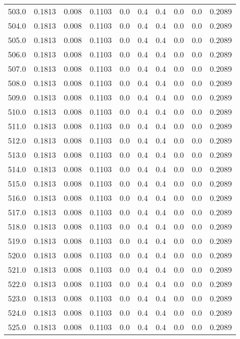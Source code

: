 \begin{longtable}{lrrrrrrrrr}
503.0 & 0.1813 & 0.008 & 0.1103 & 0.0 & 0.4 & 0.4 & 0.0 & 0.0 & 0.2089 \\
504.0 & 0.1813 & 0.008 & 0.1103 & 0.0 & 0.4 & 0.4 & 0.0 & 0.0 & 0.2089 \\
505.0 & 0.1813 & 0.008 & 0.1103 & 0.0 & 0.4 & 0.4 & 0.0 & 0.0 & 0.2089 \\
506.0 & 0.1813 & 0.008 & 0.1103 & 0.0 & 0.4 & 0.4 & 0.0 & 0.0 & 0.2089 \\
507.0 & 0.1813 & 0.008 & 0.1103 & 0.0 & 0.4 & 0.4 & 0.0 & 0.0 & 0.2089 \\
508.0 & 0.1813 & 0.008 & 0.1103 & 0.0 & 0.4 & 0.4 & 0.0 & 0.0 & 0.2089 \\
509.0 & 0.1813 & 0.008 & 0.1103 & 0.0 & 0.4 & 0.4 & 0.0 & 0.0 & 0.2089 \\
510.0 & 0.1813 & 0.008 & 0.1103 & 0.0 & 0.4 & 0.4 & 0.0 & 0.0 & 0.2089 \\
511.0 & 0.1813 & 0.008 & 0.1103 & 0.0 & 0.4 & 0.4 & 0.0 & 0.0 & 0.2089 \\
512.0 & 0.1813 & 0.008 & 0.1103 & 0.0 & 0.4 & 0.4 & 0.0 & 0.0 & 0.2089 \\
513.0 & 0.1813 & 0.008 & 0.1103 & 0.0 & 0.4 & 0.4 & 0.0 & 0.0 & 0.2089 \\
514.0 & 0.1813 & 0.008 & 0.1103 & 0.0 & 0.4 & 0.4 & 0.0 & 0.0 & 0.2089 \\
515.0 & 0.1813 & 0.008 & 0.1103 & 0.0 & 0.4 & 0.4 & 0.0 & 0.0 & 0.2089 \\
516.0 & 0.1813 & 0.008 & 0.1103 & 0.0 & 0.4 & 0.4 & 0.0 & 0.0 & 0.2089 \\
517.0 & 0.1813 & 0.008 & 0.1103 & 0.0 & 0.4 & 0.4 & 0.0 & 0.0 & 0.2089 \\
518.0 & 0.1813 & 0.008 & 0.1103 & 0.0 & 0.4 & 0.4 & 0.0 & 0.0 & 0.2089 \\
519.0 & 0.1813 & 0.008 & 0.1103 & 0.0 & 0.4 & 0.4 & 0.0 & 0.0 & 0.2089 \\
520.0 & 0.1813 & 0.008 & 0.1103 & 0.0 & 0.4 & 0.4 & 0.0 & 0.0 & 0.2089 \\
521.0 & 0.1813 & 0.008 & 0.1103 & 0.0 & 0.4 & 0.4 & 0.0 & 0.0 & 0.2089 \\
522.0 & 0.1813 & 0.008 & 0.1103 & 0.0 & 0.4 & 0.4 & 0.0 & 0.0 & 0.2089 \\
523.0 & 0.1813 & 0.008 & 0.1103 & 0.0 & 0.4 & 0.4 & 0.0 & 0.0 & 0.2089 \\
524.0 & 0.1813 & 0.008 & 0.1103 & 0.0 & 0.4 & 0.4 & 0.0 & 0.0 & 0.2089 \\
525.0 & 0.1813 & 0.008 & 0.1103 & 0.0 & 0.4 & 0.4 & 0.0 & 0.0 & 0.2089 \\

\end{longtable}
